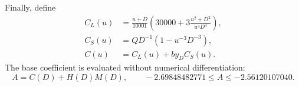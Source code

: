 \documentclass[11pt]{article}
\begin{document}
Finally, define
\begin{align*}
 C_L(u)&=\frac{u+D}{10001}
 \left(30000+3\frac{u^2+D^2}{u^4D^4}\right),\\
 C_S(u)&=QD^{-1}(1-u^{-3}D^{-3}),\\
 C(u)&=C_L(u)+by_DC_S(u).
\end{align*}
The base coefficient is evaluated without numerical differentiation:
\[
 A=C(D)+H(D)M(D),\qquad
 -2.69848482771\leq A\leq-2.56120107040.
\]
\end{document}
